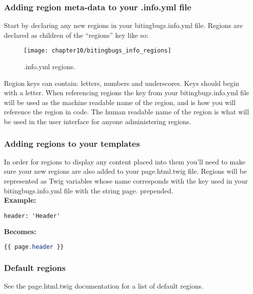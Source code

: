 \subsubsection{Adding region meta-data to your .info.yml file}

Start by declaring any new regions in your bitingbugs.info.yml file. Regions are declared as children of the “regions” key like so: 


\begin{figure}[H]
	\centering
	\texttt{[image: chapter10/bitingbugs\_info\_regions]}
	\caption{.info.yml regions.}
	\label{fig:bitingbugs_info_regions}
\end{figure}

Region keys can contain: letters, numbers and underscores. Keys should begin with a letter. When referencing regions the key from your bitingbugs.info.yml file will be used as the machine readable name of the region, and is how you will reference the region in code. The human readable name of the region is what will be used in the user interface for anyone administering regions.


\subsubsection{Adding regions to your templates}

In order for regions to display any content placed into them you'll need to make sure your new regions are also added to your page.html.twig file. Regions will be represented as Twig variables whose name corresponds with the key used in your bitingbugs.info.yml file with the string page. prepended. \\
\textbf{Example:}
\begin{lstlisting}
header: 'Header'
\end{lstlisting}
\textbf{Becomes:}
\begin{lstlisting}[language=php]
{{ page.header }}
\end{lstlisting}

\subsubsection{Default regions}
See the page.html.twig documentation for a list of default regions.
	
